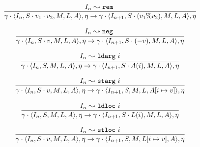 \documentclass[declaration,shortabstract,english,mgr]{iithesis}
\newcommand{\mstate}[5] {
	\langle#1, #2, #3, #4, #5\rangle
}
\newcommand{\ipointsto}[3] {
	#1 \leadsto \texttt{#2} \text{ } #3
}
\newcommand{\setarrayitem}[3] {
	#1[#2 \mapsto #3]
}
\begin{document}
\begin{equation}
\label{eq:semantics_rem}
	\infer{
		\gamma \cdot \mstate{I_n}{S \cdot v_1 \cdot v_2}{M}{L}{A}, \eta
			\rightarrow
		\gamma \cdot \mstate{I_{n+1}}{S \cdot (v_1 \% v_2)}{M}{L}{A}, \eta		
	}
	{\ipointsto{I_n}{rem}}
\end{equation}

\begin{equation}
\label{eq:semantics_neg}
	\infer{
		\gamma \cdot \mstate{I_n}{S \cdot v}{M}{L}{A}, \eta
			\rightarrow
		\gamma \cdot \mstate{I_{n+1}}{S \cdot (-v)}{M}{L}{A}, \eta		
	}
	{\ipointsto{I_n}{neg}}
\end{equation}

\begin{equation}
\label{eq:semantics_ldarg}
	\infer{
		\gamma \cdot \mstate{I_n}{S}{M}{L}{A}, \eta
			\rightarrow
		\gamma \cdot \mstate{I_{n+1}}{S \cdot A(i)}{M}{L}{A}, \eta
	}
	{\ipointsto{I_n}{ldarg}{i}}
\end{equation}

\begin{equation}
\label{eq:semantics_starg}
	\infer{
		\gamma \cdot \mstate{I_n}{S \cdot v}{M}{L}{A}, \eta
			\rightarrow
		\gamma \cdot \mstate{I_{n+1}}{S}{M}{L}{\setarrayitem{A}{i}{v}}, \eta
	}
	{\ipointsto{I_n}{starg}{i}}
\end{equation}

\begin{equation}
\label{eq:semantics_ldloc}
	\infer{
		\gamma \cdot \mstate{I_n}{S}{M}{L}{A}, \eta
			\rightarrow
		\gamma \cdot \mstate{I_{n+1}}{S \cdot L(i)}{M}{L}{A}, \eta
	}
	{\ipointsto{I_n}{ldloc}{i}}
\end{equation}

\begin{equation}
\label{eq:semantics_stloc}
	\infer{
		\gamma \cdot \mstate{I_n}{S \cdot v}{M}{L}{A}, \eta
			\rightarrow
		\gamma \cdot \mstate{I_{n+1}}{S}{M}{\setarrayitem{L}{i}{v}}{A}, \eta
	}
	{\ipointsto{I_n}{stloc}{i}}
\end{equation}

\clearpage

\end{document}

